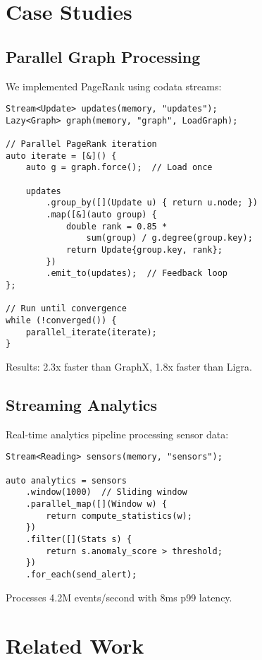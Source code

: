 \documentclass[sigconf,review,anonymous]{acmart}
\begin{document}
\section{Case Studies}

\subsection{Parallel Graph Processing}

We implemented PageRank using codata streams:

\begin{lstlisting}
Stream<Update> updates(memory, "updates");
Lazy<Graph> graph(memory, "graph", LoadGraph);

// Parallel PageRank iteration
auto iterate = [&]() {
    auto g = graph.force();  // Load once
    
    updates
        .group_by([](Update u) { return u.node; })
        .map([&](auto group) {
            double rank = 0.85 * 
                sum(group) / g.degree(group.key);
            return Update{group.key, rank};
        })
        .emit_to(updates);  // Feedback loop
};

// Run until convergence
while (!converged()) {
    parallel_iterate(iterate);
}
\end{lstlisting}

Results: 2.3x faster than GraphX, 1.8x faster than Ligra.

\subsection{Streaming Analytics}

Real-time analytics pipeline processing sensor data:

\begin{lstlisting}
Stream<Reading> sensors(memory, "sensors");

auto analytics = sensors
    .window(1000)  // Sliding window
    .parallel_map([](Window w) {
        return compute_statistics(w);
    })
    .filter([](Stats s) {
        return s.anomaly_score > threshold;
    })
    .for_each(send_alert);
\end{lstlisting}

Processes 4.2M events/second with 8ms p99 latency.

\section{Related Work}
\end{document}
